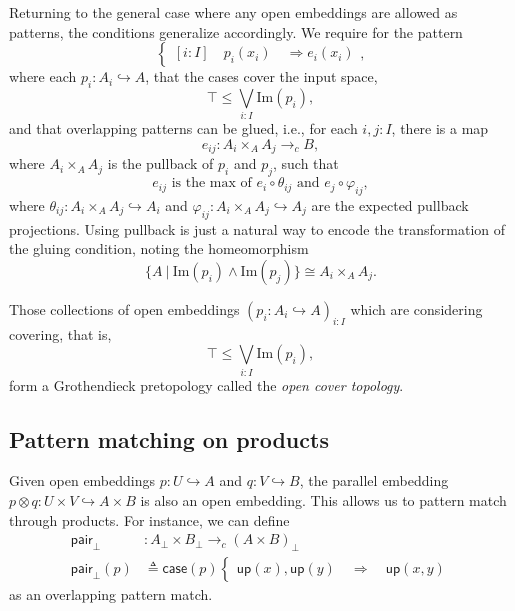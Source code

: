 \documentclass[conference]{IEEEtran}
\newcommand{\hookto}{\hookrightarrow}
\newcommand{\cto}{\to_c}
\newcommand{\suchthat}{\ |\ }
\newcommand{\Img}[1]{\text{Im}\left({#1}\right)}
\newcommand{\Branch}{\Rightarrow}
\newcommand{\up}{\mathsf{up}}
\newcommand{\isthemaxof}[3]{{#1}\text{ is the max of }{#2}\text{ and }{#3}}
\newcommand{\grammar}[1]{\textcolor{red}{\underline{#1}}}
\renewcommand{\grammar}[1]{#1}
\begin{document}
Returning to the general case where any open embeddings are allowed as patterns, the conditions generalize accordingly. We require for the pattern
\[
\begin{cases}
[i : I] \quad p_i(x_i) \quad \Branch e_i(x_i)
\end{cases},
\]
where each $p_i : A_i \hookto A$, that the cases cover the input space,
\[
\top \le \bigvee_{i : I} \Img{p_i},
\]
and that overlapping patterns can be glued, i.e., for each $i, j : I$, there is a map
\[
e_{ij} : A_i \times_A A_j \cto B,
\]
where $A_i \times_A A_j$ is the pullback of $p_i$ and $p_j$, such that 
\[
\isthemaxof{ e_{ij} }{ e_i \circ \theta_{ij}}{ e_j \circ \varphi_{ij}},
\]
where $\theta_{ij} : A_i \times_A A_j \hookto A_i$ and $\varphi_{ij} : A_i \times_A A_j \hookto A_j$ are the expected pullback projections. Using pullback is just a natural way to encode the transformation of the gluing condition, noting the homeomorphism
\[
 \{A \suchthat \Img{p_i} \wedge \Img{p_j} \} \cong A_i \times_A A_j.
\]

Those collections of open embeddings $\left( p_i : A_i \hookto A \right)_{i : I}$ which are considering covering, that is,
\[
\top \le \bigvee_{i : I} \Img{p_i},
\]
form a Grothendieck pretopology called the \emph{open cover topology}.

\subsection{Pattern matching on products}

Given open embeddings $p : U \hookto A$ and $q : V \hookto B$, the parallel embedding $p \otimes q : U \times V \hookto A \times B$ is also an open embedding. \grammar{This} allows us to pattern match through products. 
For instance, we can define
\begin{align*}
 \mathsf{pair}_\bot &: A_\bot \times B_\bot \cto \left( A \times B \right)_\bot
\\ \mathsf{pair}_\bot(p) &\triangleq \mathsf{case}(p)
\begin{cases}
\up(x) , \up(y)
  \quad \Branch \quad \up(x, y)
\end{cases}
\end{align*}
as an overlapping pattern match.
\end{document}
